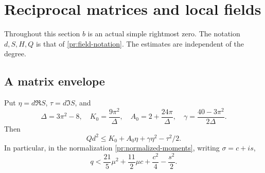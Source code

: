 \section{Reciprocal matrices and local fields}\label{sec:matrix-fields}

Throughout this section $b$ is an actual simple rightmost zero.
The notation $d,S,H,Q$ is that of \eqref{pr:field-notation}.
The estimates are independent of the degree.

\subsection{A matrix envelope}

\begin{proposition}\label{mf:envelope}
Put $\eta=d\Re S$, $\tau=d\Im S$, and
\[
 \Delta=3\pi^2-8,\quad K_0=\frac{9\pi^2}{\Delta},\quad
 A_0=2+\frac{24\pi}{\Delta},\quad
 \gamma=\frac{40-3\pi^2}{2\Delta}.
\]
Then
\begin{equation}\label{mf:exact-envelope}
 Qd^2\le K_0+A_0\eta+\gamma\eta^2-\tau^2/2.
\end{equation}
In particular, in the normalization \eqref{pr:normalized-moments},
writing $\sigma=c+is$,
\begin{equation}\label{mf:coarse-envelope}
 q<\frac{21}{5}\mu^2+\frac{11}{2}\mu c+\frac{c^2}{4}-\frac{s^2}{2}.
\end{equation}
\end{proposition}

